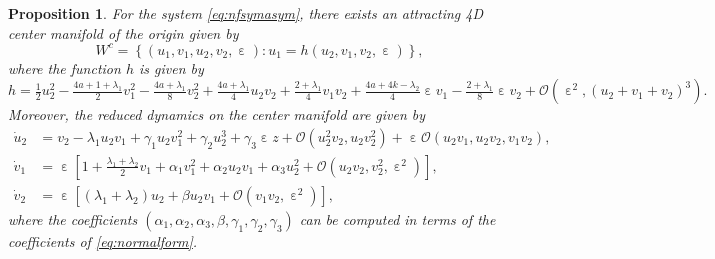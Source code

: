 \documentclass[10pt,onecolumn]{article}
\theoremstyle{plain}
\newtheorem{proposition}{Proposition}[section]
\DeclareMathOperator{\eps}{\varepsilon}
\begin{document}
\begin{proposition}
For the system \eqref{eq:nfsymasym}, there exists an attracting 4D center manifold of the origin given by 
%
\[ W^c = \left\{ (u_1,v_1,u_2,v_2,\eps) : 
u_1 = h(u_2,v_1,v_2,\eps)
\right\}, \]
%
where the function $h$ is given by 
%
\[ h = \tfrac{1}{2}u_2^2 -\tfrac{4a+1+\lambda_1}{2}v_1^2 - \tfrac{4a+\lambda_1}{8} v_2^2+\tfrac{4a+\lambda_1}{4} u_2 v_2 + \tfrac{2+\lambda_1}{4} v_1 v_2 +\tfrac{4a+4k-\lambda_2}{4} \eps v_1 - \tfrac{2+\lambda_1}{8} \eps v_2 + \mathcal O \left( \eps^2,(u_2+v_1+v_2)^3 \right). \]
%
Moreover, the reduced dynamics on the center manifold are given by
%
\begin{equation} \label{eq:dynamicsonWc}
  \begin{split}
    \dot u_2 &= v_2 - \lambda_1 u_2 v_1 + \gamma_1 u_2 v_1^2 + \gamma_2 u_2^3 + \gamma_3 \eps z + \mathcal O \left( u_2^2 v_2, u_2 v_2^2  \right) + \eps \mathcal O \left( u_2 v_1, u_2 v_2, v_1 v_2 \right), \\
    \dot v_1 &= \eps \left[ 1 + \tfrac{\lambda_1+\lambda_2}{2} v_1 + \alpha_1 v_1^2 + \alpha_2 u_2 v_1 + \alpha_3 u_2^2 + \mathcal O \left( u_2 v_2, v_2^2, \eps^2 \right) \right], \\
    \dot v_2 &= \eps \left[ (\lambda_1+\lambda_2) u_2 + \beta u_2 v_1 + \mathcal O \left( v_1 v_2, \eps^2 \right) \right],
  \end{split}
\end{equation}
%
where the coefficients $(\alpha_1,\alpha_2,\alpha_3,\beta,\gamma_1,\gamma_2,\gamma_3)$ can be computed in terms of the coefficients of \eqref{eq:normalform}.
\end{proposition}
\end{document}
